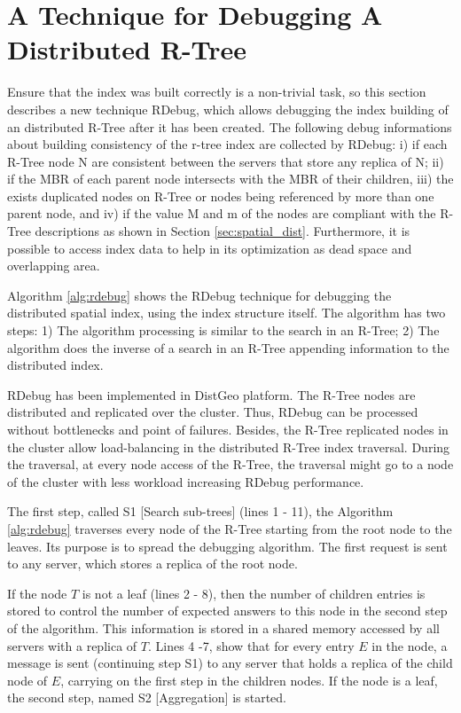 \section{A Technique for Debugging A Distributed R-Tree}
\label{sec:rdebug}

Ensure that the index was built correctly is a non-trivial task, so this section describes a new technique RDebug, which allows debugging the index building of an distributed R-Tree after it has been created. 
The following debug informations about building consistency of the r-tree index are collected by RDebug: 
i) if each R-Tree node N are consistent between the servers that store any replica of N;
ii) if the MBR of each parent node intersects with the MBR of their children, 
iii) the exists duplicated nodes on R-Tree or nodes being referenced by more than one parent node, and 
iv) if the value M and m of the nodes are compliant with the R-Tree descriptions as shown in Section \ref{sec:spatial_dist}. 
Furthermore, it is possible to access index data to help in its optimization as dead space and overlapping area.

Algorithm \ref{alg:rdebug} shows the RDebug technique for debugging the distributed spatial index, using the index structure itself. The algorithm has two steps:
1) The algorithm processing is similar to the search in an R-Tree; 2) The algorithm does the inverse of a search in an R-Tree appending information to the distributed index.

RDebug has been implemented in DistGeo platform. The R-Tree nodes are distributed and replicated over the cluster. Thus, RDebug can be processed without bottlenecks and point of failures. 
Besides, the R-Tree replicated nodes in the cluster allow load-balancing in the distributed R-Tree index traversal. 
During the traversal, at every node access of the R-Tree, the traversal might go to a node of the cluster with less workload increasing RDebug performance. 

The first step, called S1 [Search sub-trees] (lines 1 - 11), the Algorithm \ref{alg:rdebug} traverses every node of the R-Tree starting from the root node to the leaves. Its purpose is to spread the debugging algorithm. 
The first request is sent to any server, which stores a replica of the root node.

If the node $T$ is not a leaf (lines 2 - 8), then the number of children entries is stored to control the number of expected answers to this node in the second step of the algorithm. 
This information is stored in a shared memory accessed by all servers with a replica of $T$. Lines 4 -7, show that for every entry $E$ in the node, 
a message is sent (continuing step S1) to any server that holds a replica of the child node of $E$, carrying on the first step in the children nodes. 
If the node is a leaf, the second step, named S2 [Aggregation] is started.

